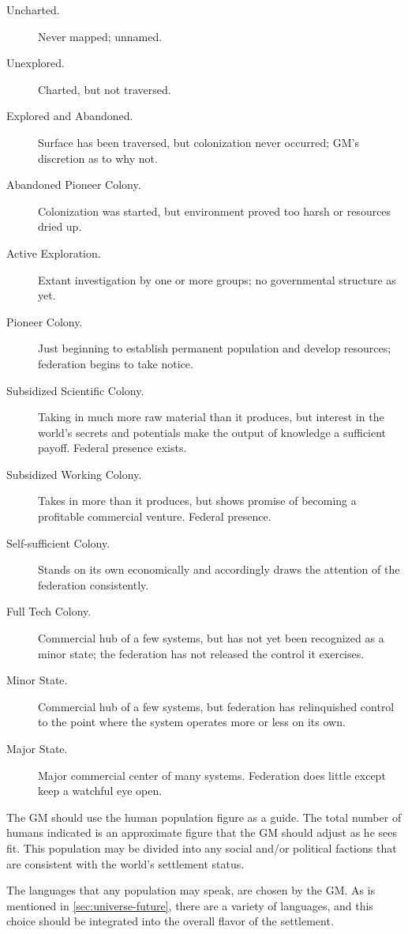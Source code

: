 \begin{description}
\item[Uncharted.] Never mapped; unnamed.
\item[Unexplored.] Charted, but not traversed.
\item[Explored and Abandoned.] Surface has been traversed, but
  colonization never occurred; GM's discretion as to why not.
\item[Abandoned Pioneer Colony.] Colonization was started, but
  environment proved too harsh or resources dried up.
\item[Active Exploration.] Extant investigation by one or more groups;
  no governmental structure as yet.
\item[Pioneer Colony.] Just beginning to establish permanent
  population and develop resources; federation begins to take notice.
\item[Subsidized Scientific Colony.] Taking in much more raw material
  than it produces, but interest in the world's secrets and potentials
  make the output of knowledge a sufficient payoff. Federal presence
  exists.
\item[Subsidized Working Colony.] Takes in more than it produces, but
  shows promise of becoming a profitable commercial venture.  Federal
  presence.
\item[Self-sufficient Colony.] Stands on its own economically and
  accordingly draws the attention of the federation consistently.
\item[Full Tech Colony.] Commercial hub of a few systems, but has not
  yet been recognized as a minor state; the federation has not
  released the control it exercises.
\item[Minor State.] Commercial hub of a few systems, but federation
  has relinquished control to the point where the system operates more
  or less on its own.
\item[Major State.] Major commercial center of many systems.
  Federation does little except keep a watchful eye open.
\end{description}

The GM should use the human population figure as a guide. The total
number of humans indicated is an approximate figure that the GM
should adjust as he sees fit. This population may be divided into any
social and/or political factions that are consistent with the world's
settlement status.

The languages that any population may speak, are chosen by the GM.
As is mentioned in \ref{sec:universe-future}, there are a variety of
languages, and this choice should be integrated into the overall
flavor of the settlement.

